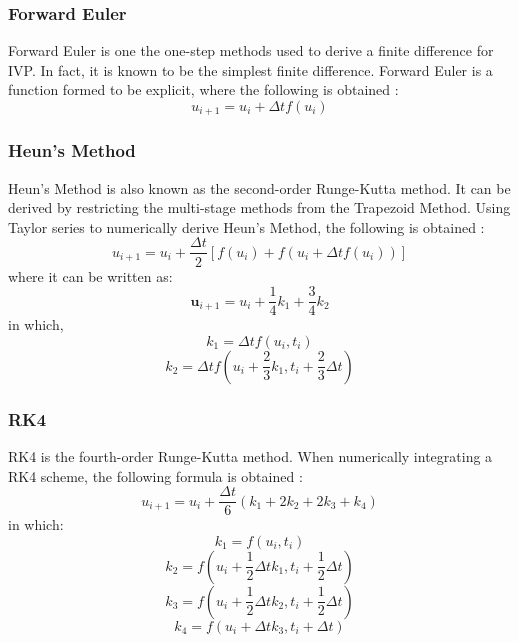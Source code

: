 \documentclass[conf]{new-aiaa}
\begin{document}
        \subsubsection{Forward Euler}
        Forward Euler is one the one-step methods used to derive a finite difference for IVP. In fact, it is known to be the simplest finite difference. Forward Euler is a function formed to be explicit, where the following is obtained \cite{LecOSM}: 
        \begin{equation}
            u_{i+1} = u_{i} + {\Delta t}f(u_{i})
        \end{equation}
        
        \subsubsection{Heun's Method}
        Heun's Method is also known as the second-order Runge-Kutta method. It can be derived by restricting the multi-stage methods from the Trapezoid Method. Using Taylor series to numerically derive Heun's Method, the following is obtained \cite{LecOSM}: 
        \begin{equation}
            u_{i+1} = u_{i} + \frac{\Delta t}{2}[f(u_{i})+f(u_i+{\Delta t}f(u_{i}))]
        \end{equation}
        where it can be written as:
        \begin{equation}
            \bm{u}_{i+1} = u_i + \frac{1}{4}k_1 + \frac{3}{4}k_2
        \end{equation}
        in which,
        \begin{equation*}
            k_1 = \Delta t f(u_i,t_i) 
        \end{equation*}
        \begin{equation*}
             k_2 = \Delta t f(u_i + \frac{2}{3}k_1 , t_i + \frac{2}{3}\Delta t)
        \end{equation*}
        \subsubsection{RK4}
        RK4 is the fourth-order Runge-Kutta method. When numerically integrating a RK4 scheme, the following formula is obtained \cite{LecOSM}:
        \begin{equation}
            u_{i+1} = u_{i} + \frac{\Delta t}{6}(k_1 + 2k_2 + 2k_3 + k_4)
        \end{equation}
        in which:
        \begin{equation*}
            k_1 = f(u_i,t_i)
        \end{equation*}
        \begin{equation*}
            k_2 = f(u_i + \frac{1}{2}\Delta t k_1 , t_i + \frac{1}{2} \Delta t)
        \end{equation*}
        \begin{equation*}
            k_3 = f(u_i + \frac{1}{2}\Delta t k_2, t_i + \frac{1}{2} \Delta t)
        \end{equation*}
        \begin{equation*}
            k_4 = f(u_i + \Delta t k_3 , t_i + \Delta t)
        \end{equation*}
        
\end{document}
